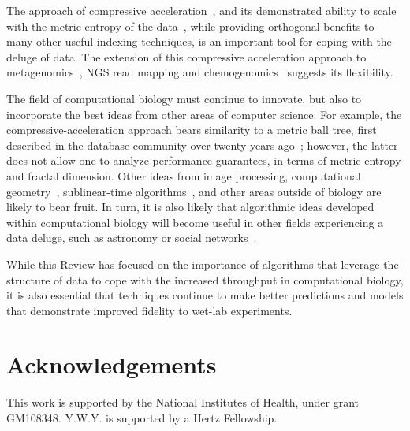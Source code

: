 \documentclass{acm_proc_article-sp}
\begin{document}
The approach of compressive acceleration~\cite{loh2012compressive}, and its 
demonstrated ability to scale with the metric entropy of the 
data~\cite{yu2015entropy}, while providing orthogonal benefits to many other
useful indexing techniques, is an important tool for coping with the deluge of
data.
The extension of this compressive acceleration approach to 
metagenomics~\cite{yu2015entropy}, NGS read 
mapping and chemogenomics~\cite{yorukoglu2015compressive} suggests its 
flexibility.

The field of computational biology must continue to innovate, but also to 
incorporate the best ideas from other areas of computer science.
For example, the compressive-acceleration approach bears similarity to a metric 
ball tree, first described in the database community over twenty years 
ago~\cite{uhlmann1991satisfying};
however, the latter does not allow one to analyze performance guarantees, 
in terms of metric entropy and fractal dimension.
Other ideas from image processing, computational geometry~\cite{indyk1998approximate}, sublinear-time algorithms~\cite{rubinfeld2011sublinear}, and other areas 
outside of biology are likely to bear fruit. 
In turn, it is also likely that algorithmic ideas developed within computational biology
will become useful in other fields experiencing a data deluge, such as astronomy
or social networks~\cite{stephens2015big}.


While this Review has focused on the importance of algorithms that leverage the
structure of data to cope with the increased throughput in computational 
biology, it is also essential that techniques continue to make better 
predictions and models that demonstrate improved fidelity to wet-lab 
experiments.

\section{Acknowledgements}
This work is supported by the National Institutes of Health, under
grant GM108348.
Y.W.Y. is supported by a Hertz Fellowship.






\end{document}
